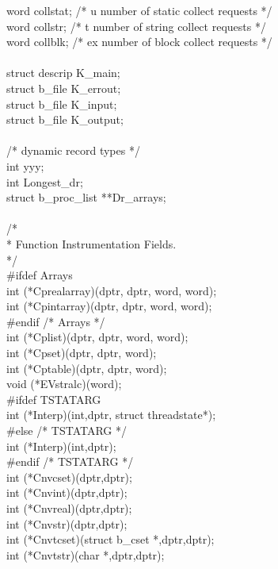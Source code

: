 \begin{iconcode}
   word collstat;			/*  u      number of static collect requests */\\
   word collstr;			/*  t      number of string collect requests */\\
   word collblk;			/*  ex     number of block collect requests */\\
\ \\
   struct descrip K\_main;\\
   struct b\_file K\_errout;\\
   struct b\_file K\_input;\\
   struct b\_file K\_output;\\
\ \\
   /* dynamic record types */\\
  int yyy;\\
  int Longest\_dr;\\
  struct b\_proc\_list **Dr\_arrays;\\
\ \\
   /*\\
    * Function Instrumentation Fields.\\
    */\\
\#ifdef Arrays \\
   int (*Cprealarray)(dptr, dptr, word, word);\\
   int (*Cpintarray)(dptr, dptr, word, word);\\
\#endif					/* Arrays */\\
   int (*Cplist)(dptr, dptr, word, word);\\
   int (*Cpset)(dptr, dptr, word);\\
   int (*Cptable)(dptr, dptr, word);\\
   void (*EVstralc)(word);\\
\#ifdef TSTATARG\\
   int (*Interp)(int,dptr, struct threadstate*);\\
\#else 		 	   	  	 /* TSTATARG */\\
   int (*Interp)(int,dptr);\\
\#endif 		 	   	  	 /* TSTATARG */\\
   int (*Cnvcset)(dptr,dptr);\\
   int (*Cnvint)(dptr,dptr);\\
   int (*Cnvreal)(dptr,dptr);\\
   int (*Cnvstr)(dptr,dptr);\\
   int (*Cnvtcset)(struct b\_cset *,dptr,dptr);\\
   int (*Cnvtstr)(char *,dptr,dptr);\\

\end{iconcode}
